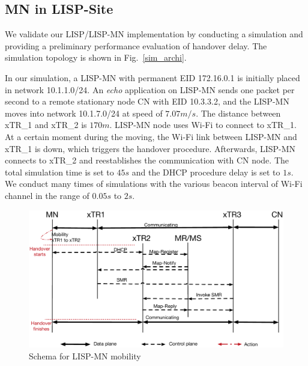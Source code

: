 \subsection{MN in LISP-Site}
\label{sec:ns3_analysis_xTR}
We validate our LISP/LISP-MN implementation by conducting a simulation and providing a preliminary performance evaluation of handover delay. The simulation topology is shown in Fig.~\ref{sim_archi}.

In our simulation, a LISP-MN with permanent EID 172.16.0.1 is initially placed in network 10.1.1.0/24. An \emph{echo} application on LISP-MN sends one packet per second to a remote stationary node CN with EID 10.3.3.2, and the LISP-MN moves into network 10.1.7.0/24 at speed of $7.07m/s$. The distance between xTR\_1 and xTR\_2 is $170m$. LISP-MN node uses Wi-Fi to connect to xTR\_1. At a certain moment during the moving, the Wi-Fi link between LISP-MN and xTR\_1 is down, which triggers the handover procedure. Afterwards, LISP-MN connects to xTR\_2 and reestablishes the communication with CN node. The total simulation time is set to $45s$ and the DHCP procedure delay is set to $1s$. We conduct many times of simulations with the various beacon interval of Wi-Fi channel in the range of $0.05s$ to $2s$.

\begin{figure}[!th]
	\centering
	\includegraphics[width=\textwidth]{Pics/Mobility_xTR_schema_SMR_simplify}
	\caption{Schema for LISP-MN mobility}
	\label{sim_schema}
\end{figure}

